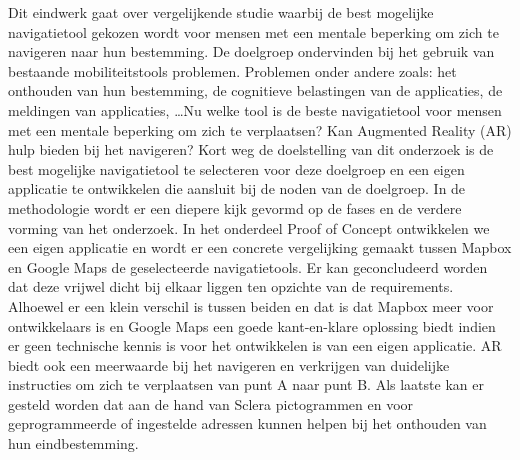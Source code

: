 Dit eindwerk gaat over vergelijkende studie waarbij de best mogelijke navigatietool gekozen wordt voor mensen met een mentale beperking om zich te navigeren naar hun bestemming. De doelgroep ondervinden bij het gebruik van bestaande mobiliteitstools problemen. Problemen onder andere zoals: het onthouden van hun bestemming, de cognitieve belastingen van de applicaties, de meldingen van applicaties, \ldots Nu welke tool is de beste navigatietool voor mensen met een mentale beperking om zich te verplaatsen? Kan Augmented Reality (AR) hulp bieden bij het navigeren? Kort weg de doelstelling van dit onderzoek is de best mogelijke navigatietool te selecteren voor deze doelgroep en een eigen applicatie te ontwikkelen die aansluit bij de noden van de doelgroep. In de methodologie wordt er een diepere kijk gevormd op de fases en de verdere vorming van het onderzoek. In het onderdeel Proof of Concept ontwikkelen we een eigen applicatie en wordt er een concrete vergelijking gemaakt tussen Mapbox en Google Maps de geselecteerde navigatietools. Er kan geconcludeerd worden dat deze vrijwel dicht bij elkaar liggen ten opzichte van de requirements. Alhoewel er een klein verschil is tussen beiden en dat is dat Mapbox meer voor ontwikkelaars is en Google Maps een goede kant-en-klare oplossing biedt indien er geen technische kennis is voor het ontwikkelen is van een eigen applicatie. AR biedt ook een meerwaarde bij het navigeren en verkrijgen van duidelijke instructies om zich te verplaatsen van punt A naar punt B. Als laatste kan er gesteld worden dat aan de hand van Sclera pictogrammen en voor geprogrammeerde of ingestelde adressen kunnen helpen bij het onthouden van hun eindbestemming.
